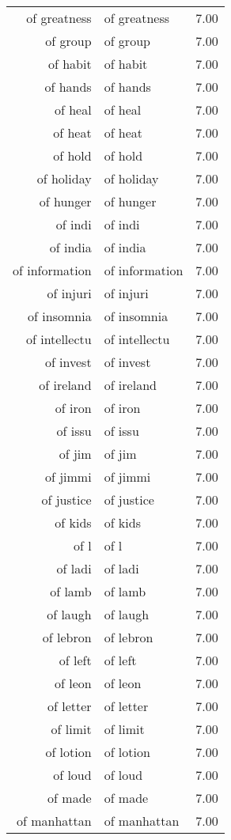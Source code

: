 \begin{table}[ht]
\begin{tabular}{rlr}
  of greatness & of greatness & 7.00 \\ 
  of group & of group & 7.00 \\ 
  of habit & of habit & 7.00 \\ 
  of hands & of hands & 7.00 \\ 
  of heal & of heal & 7.00 \\ 
  of heat & of heat & 7.00 \\ 
  of hold & of hold & 7.00 \\ 
  of holiday & of holiday & 7.00 \\ 
  of hunger & of hunger & 7.00 \\ 
  of indi & of indi & 7.00 \\ 
  of india & of india & 7.00 \\ 
  of information & of information & 7.00 \\ 
  of injuri & of injuri & 7.00 \\ 
  of insomnia & of insomnia & 7.00 \\ 
  of intellectu & of intellectu & 7.00 \\ 
  of invest & of invest & 7.00 \\ 
  of ireland & of ireland & 7.00 \\ 
  of iron & of iron & 7.00 \\ 
  of issu & of issu & 7.00 \\ 
  of jim & of jim & 7.00 \\ 
  of jimmi & of jimmi & 7.00 \\ 
  of justice & of justice & 7.00 \\ 
  of kids & of kids & 7.00 \\ 
  of l & of l & 7.00 \\ 
  of ladi & of ladi & 7.00 \\ 
  of lamb & of lamb & 7.00 \\ 
  of laugh & of laugh & 7.00 \\ 
  of lebron & of lebron & 7.00 \\ 
  of left & of left & 7.00 \\ 
  of leon & of leon & 7.00 \\ 
  of letter & of letter & 7.00 \\ 
  of limit & of limit & 7.00 \\ 
  of lotion & of lotion & 7.00 \\ 
  of loud & of loud & 7.00 \\ 
  of made & of made & 7.00 \\ 
  of manhattan & of manhattan & 7.00 \\ 

\end{tabular}
\end{table}
